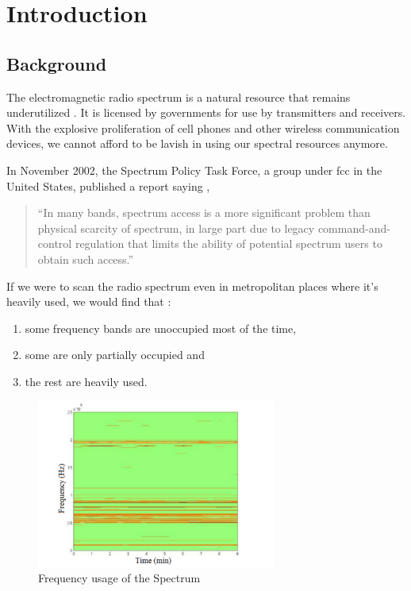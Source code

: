 \chapter{Introduction}
\section{Background}
The electromagnetic radio spectrum is a natural resource that remains 
underutilized \cite{haykin05}.
It is licensed by governments for use by transmitters and receivers.
With the explosive proliferation of cell phones and other wireless 
communication devices,
we cannot afford to be lavish in using our spectral resources anymore.

In November 2002, the Spectrum Policy Task Force, a group under \gls{fcc}
 in the United States, published a report saying
\cite{repFCC}, 
\begin{quote}
``In many bands, spectrum access is a more significant problem than physical 
scarcity of spectrum, in large part due to legacy command-and-control 
regulation that limits the ability of potential spectrum users to obtain such 
access.''
\end{quote}

If we were to scan the radio spectrum even in metropolitan places where it's
heavily used, 
we would find that \cite{staple04}:
\begin{enumerate}
	\item some frequency bands are unoccupied most of the time,
	\item some are only partially occupied and
	\item the rest are heavily used.
\end{enumerate}

\begin{figure}
\centering
\includegraphics[width=0.7\textwidth]{../images/freqUsage}
\caption{Frequency usage of the Spectrum}
\label{freqUsage}
\end{figure}

